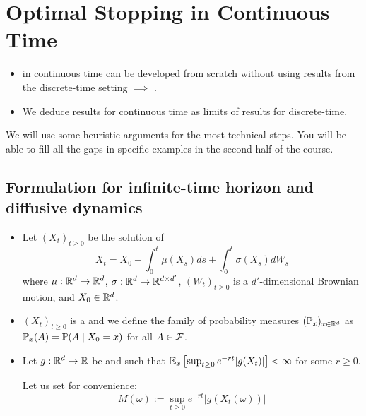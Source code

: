 \section{Optimal Stopping in Continuous Time}

\begin{itemize}
    \item {} in continuous time can be developed from scratch without using results from the discrete-time setting $\implies$ .
    \item We deduce results for continuous time as limits of results for discrete-time.
\end{itemize}

\begin{remark*}[Warning]
    We will use some heuristic arguments for the most technical steps. You will be able to fill all the gaps in specific examples in the second half of the course.
\end{remark*}

\subsection*{Formulation for infinite-time horizon and diffusive dynamics}

\begin{itemize}
    \item Let $(X_t)_{t \geq 0}$ be the solution of
    \begin{equation*}
        X_t = X_0 + \int_0^t \mu(X_s) ds + \int_0^t \sigma(X_s) dW_s
    \end{equation*}
    where $\mu: \mathbb R^d \to \mathbb R^d$, $\sigma: \mathbb R^d \to \mathbb R^{d \times d'}$, $(W_t)_{t \geq 0}$ is a $d'$-dimensional Brownian motion, and $X_0 \in \mathbb R^d$.
    
    \item $(X_t)_{t \geq 0}$ is a  and we define the family of probability measures $(\mathbb P_x)_{x \in \mathbb R^d}$ as $\mathbb P_x(A) = \mathbb P(A \mid X_0 = x)$ for all $A \in \mathcal{F}$.
    
    \item Let $g: \mathbb R^d \to \mathbb R$ be  and such that $\mathbb E_x \left[ \sup_{t \geq 0} e^{-rt} |g(X_t)| \right] < \infty$ for some $r \geq 0$.
    
    Let us set for convenience:
    \begin{equation*}
        \boxed{\overline{M}(\omega) := \sup_{t \geq 0} e^{-rt} |g(X_t(\omega))|}
    \end{equation*}
\end{itemize}


